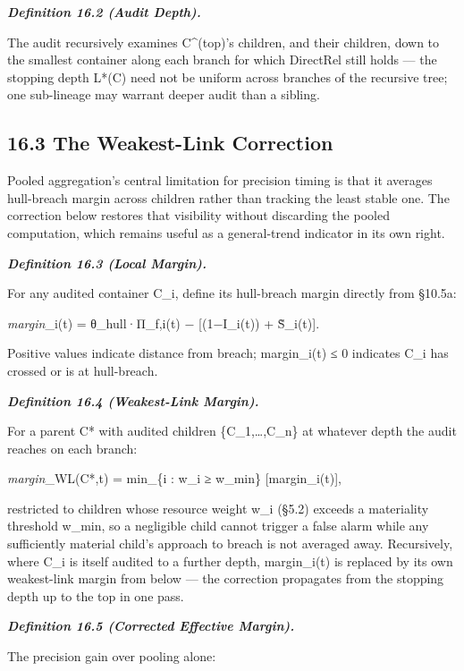 \documentclass[
]{article}
\begin{document}
\emph{\textbf{Definition 16.2 (Audit Depth).}}

The audit recursively examines C\^{}(top)'s children, and their
children, down to the smallest container along each branch for which
DirectRel still holds --- the stopping depth L*(C) need not be uniform
across branches of the recursive tree; one sub-lineage may warrant
deeper audit than a sibling.

\hypertarget{the-weakest-link-correction}{%
\subsection{16.3 The Weakest-Link
Correction}\label{the-weakest-link-correction}}

Pooled aggregation's central limitation for precision timing is that it
averages hull-breach margin across children rather than tracking the
least stable one. The correction below restores that visibility without
discarding the pooled computation, which remains useful as a
general-trend indicator in its own right.

\emph{\textbf{Definition 16.3 (Local Margin).}}

For any audited container C\_i, define its hull-breach margin directly
from §10.5a:

\emph{margin}\_i(t) = θ\_hull·Π\_f,i(t) − {[}(1−I\_i(t)) + S̃\_i(t){]}.

Positive values indicate distance from breach; margin\_i(t) ≤ 0
indicates C\_i has crossed or is at hull-breach.

\emph{\textbf{Definition 16.4 (Weakest-Link Margin).}}

For a parent C* with audited children \{C\_1,\ldots,C\_n\} at whatever
depth the audit reaches on each branch:

\emph{margin}\_WL(C*,t) = min\_\{i : w\_i ≥ w\_min\} {[}margin\_i(t){]},

restricted to children whose resource weight w\_i (§5.2) exceeds a
materiality threshold w\_min, so a negligible child cannot trigger a
false alarm while any sufficiently material child's approach to breach
is not averaged away. Recursively, where C\_i is itself audited to a
further depth, margin\_i(t) is replaced by its own weakest-link margin
from below --- the correction propagates from the stopping depth up to
the top in one pass.

\emph{\textbf{Definition 16.5 (Corrected Effective Margin).}}

The precision gain over pooling alone:
\end{document}
